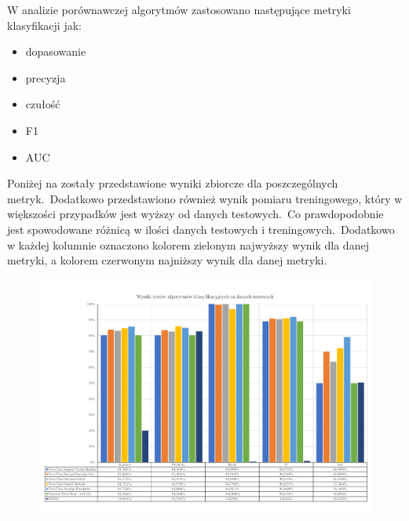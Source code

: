 W analizie porównawczej algorytmów zastosowano następujące metryki klasyfikacji jak:
\begin{itemize}
    \item dopasowanie
    \item precyzja
    \item czułość
    \item F1
    \item AUC
\end{itemize}

Poniżej na  zostały przedstawione wyniki zbiorcze dla poszczególnych metryk.\ Dodatkowo przedstawiono również wynik pomiaru treningowego, który w większości przypadków jest wyższy od danych testowych.\ Co prawdopodobnie jest spowodowane różnicą w ilości danych testowych i treningowych.\ Dodatkowo w każdej kolumnie oznaczono kolorem zielonym najwyższy wynik dla danej metryki, a kolorem czerwonym najniższy wynik dla danej metryki.

\begin{landscape}
    \vspace*{\fill}
    \begin{figure}[H]
        \centering
        \includegraphics[height=0.8\textwidth]{images/predict_result}
        \label{fig:predict-result}
    \end{figure}
    \vfill
\end{landscape}


